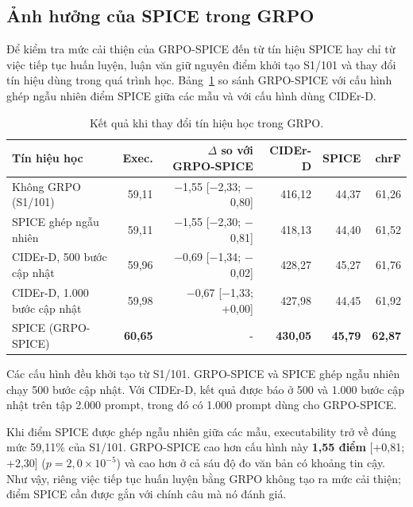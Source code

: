 \subsection{Ảnh hưởng của SPICE trong GRPO}

Để kiểm tra mức cải thiện của GRPO-SPICE đến từ tín hiệu SPICE hay chỉ từ việc tiếp tục huấn luyện, luận văn giữ nguyên điểm khởi tạo S1/101 và thay đổi tín hiệu dùng trong quá trình học. Bảng~\ref{tab:6.3} so sánh GRPO-SPICE với cấu hình ghép ngẫu nhiên điểm SPICE giữa các mẫu và với cấu hình dùng CIDEr-D.

\begin{table}[htbp]
\centering\small
\caption{Kết quả khi thay đổi tín hiệu học trong GRPO.}\label{tab:6.3}
\setlength{\tabcolsep}{4pt}
\begin{tabular}{@{}lrrrrr@{}}
\toprule
\textbf{Tín hiệu học} & \textbf{Exec.} & \textbf{$\Delta$ so với GRPO-SPICE} & \textbf{CIDEr-D} & \textbf{SPICE} & \textbf{chrF} \\
\midrule
Không GRPO (S1/101) & 59,11 & $-$1,55 [$-$2,33; $-$0,80] & 416,12 & 44,37 & 61,26 \\
SPICE ghép ngẫu nhiên & 59,11 & $-$1,55 [$-$2,30; $-$0,81] & 418,13 & 44,40 & 61,52 \\
CIDEr-D, 500 bước cập nhật & 59,96 & $-$0,69 [$-$1,34; $-$0,02] & 428,27 & 45,27 & 61,76 \\
CIDEr-D, 1.000 bước cập nhật & 59,98 & $-$0,67 [$-$1,33; +0,00] & 427,98 & 44,45 & 61,92 \\
SPICE (GRPO-SPICE) & \textbf{60,65} & - & \textbf{430,05} & \textbf{45,79} & \textbf{62,87} \\
\bottomrule
\end{tabular}

\smallskip
\begin{minipage}{\linewidth}\footnotesize Các cấu hình đều khởi tạo từ S1/101. GRPO-SPICE và SPICE ghép ngẫu nhiên chạy 500 bước cập nhật. Với CIDEr-D, kết quả được báo ở 500 và 1.000 bước cập nhật trên tập 2.000 prompt, trong đó có 1.000 prompt dùng cho GRPO-SPICE.\end{minipage}
\end{table}

Khi điểm SPICE được ghép ngẫu nhiên giữa các mẫu, executability trở về đúng mức 59,11\% của S1/101. GRPO-SPICE cao hơn cấu hình này \textbf{1,55 điểm} [+0,81; +2,30] ($p = 2{,}0 \times 10^{-5}$) và cao hơn ở cả sáu độ đo văn bản có khoảng tin cậy. Như vậy, riêng việc tiếp tục huấn luyện bằng GRPO không tạo ra mức cải thiện; điểm SPICE cần được gắn với chính câu mà nó đánh giá.

